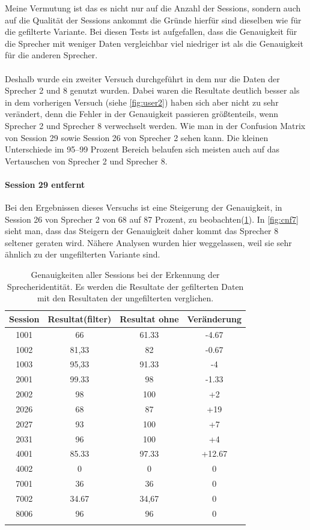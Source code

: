 Meine Vermutung ist das es nicht nur auf die Anzahl der Sessions, sondern auch auf die Qualität der Sessions ankommt die Gründe hierfür sind dieselben wie für die gefilterte Variante.
Bei diesen Tests ist aufgefallen, dass die Genauigkeit für die Sprecher mit weniger Daten vergleichbar viel niedriger ist als die Genauigkeit für die anderen Sprecher. 
\paragraph{}
Deshalb wurde ein zweiter Versuch durchgeführt in dem nur die Daten der Sprecher 2 und 8 genutzt wurden. Dabei waren die Resultate deutlich besser als in dem vorherigen Versuch (siehe \ref{fig:user2}) haben sich aber nicht zu sehr verändert, denn die Fehler in der Genauigkeit passieren größtenteils, wenn Sprecher 2 und Sprecher 8 verwechselt werden. Wie man in der Confusion Matrix von Session 29 sowie Session 26 von Sprecher 2 sehen kann. Die kleinen Unterschiede im 95–99 Prozent Bereich belaufen sich meisten auch auf das Vertauschen von Sprecher 2 und Sprecher 8.

\paragraph{Session 29 entfernt} 
Bei den Ergebnissen dieses Versuchs ist eine Steigerung der Genauigkeit, in Session 26 von Sprecher 2 von 68 auf 87 Prozent, zu beobachten(\ref{tab:FilteredSessionsNo29}). In \ref{fig:cnf7} sieht man, dass das Steigern der Genauigkeit daher kommt das Sprecher 8 seltener geraten wird. Nähere Analysen wurden hier weggelassen, weil sie sehr ähnlich zu der ungefilterten Variante sind.

\begin{table}[H]
 \centering
 \caption{Genauigkeiten aller Sessions bei der Erkennung der Sprecheridentität. Es werden die Resultate der gefilterten Daten mit den Resultaten der ungefilterten verglichen.}
\begin{tabular}{|c|c|c|c|}
\hline 
Session & Resultat(filter) & Resultat ohne & Veränderung \\ 
\hline 
1001 & 66 & 61.33 & -4.67 \\ 
\hline 
1002 & 81,33 & 82 & -0.67 \\ 
\hline 
1003 & 95,33 & 91.33 & -4 \\ 
\hline 
2001 & 99.33 & 98 & -1.33 \\  
\hline 
2002 & 98 & 100 & +2\\ 
\hline 
2026 & 68 & 87 & +19 \\ 
\hline 
2027 & 93 & 100 & +7 \\ 
\hline 
2031 & 96 & 100 & +4\\ 
\hline 
4001 & 85.33 & 97.33 & +12.67 \\ 
\hline 
4002 & 0 & 0 & 0 \\ 
\hline 
7001 & 36 & 36 & 0 \\ 
\hline 
7002 & 34.67 & 34,67 & 0\\ 
\hline 
8006 & 96 & 96 & 0 \\
\hline
\label{tab:FilteredSessionsNo29} 
\end{tabular}
\end{table}

